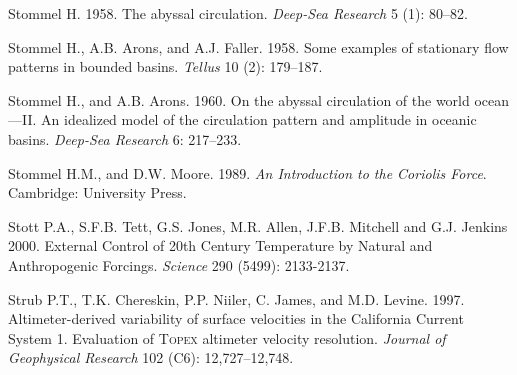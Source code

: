 \begin{thebibliography}{999}
Stommel H.  1958. The abyssal circulation. \textit{Deep-Sea
  Research} 5 (1): 80--82.
%

Stommel H., A.B. Arons, and A.J. Faller.  1958. Some examples of
stationary flow patterns in bounded basins. \textit{Tellus} 10 (2):
179--187.
%

Stommel H., and A.B. Arons.  1960. On the abyssal circulation of the
world ocean---II. An idealized model of the circulation pattern and
amplitude in oceanic basins. \textit{Deep-Sea Research} 6: 217--233.
%

Stommel H.M., and D.W. Moore.  1989. \textit{An Introduction to the
  Coriolis Force}.  Cambridge: University Press.
%

Stott P.A., S.F.B. Tett, G.S. Jones, M.R. Allen, J.F.B. Mitchell and
G.J. Jenkins 2000. External Control of 20th Century Temperature by
Natural and Anthropogenic Forcings. \textit{Science} 290 (5499):
2133-2137.
%

Strub P.T., T.K. Chereskin, P.P. Niiler, C. James, and M.D. Levine.
1997. Altimeter-derived variability of surface velocities in the
California Current System 1. Evaluation of \textsc{Topex} altimeter
velocity resolution.  \textit{Journal of Geophysical Research} 102
(C6): 12,727--12,748.
%


\end{thebibliography}
